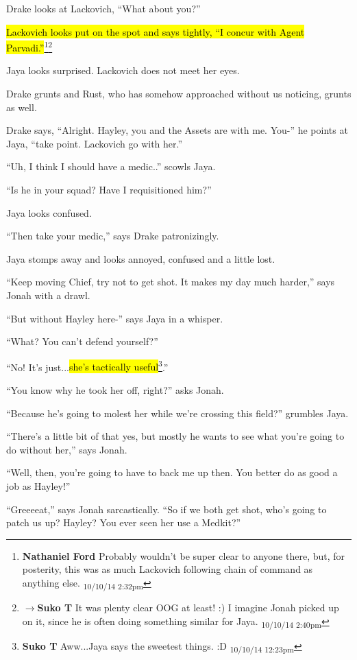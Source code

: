 Drake looks at Lackovich, ``What about you?''

\hl{Lackovich looks put on the spot and says tightly, ``I concur with Agent Parvadi.''}\footnote{\textbf{Nathaniel Ford }Probably wouldn't be super clear to anyone there, but, for posterity, this was as much Lackovich following chain of command as anything else. \textsubscript{10/10/14 2:32pm}}\footnote{$\rightarrow$\textbf{Suko T }It was plenty clear OOG at least! :) I imagine Jonah picked up on it, since he is often doing something similar for Jaya. \textsubscript{10/10/14 2:40pm}}

Jaya looks surprised.  Lackovich does not meet her eyes.

Drake grunts and Rust, who has somehow approached without us noticing, grunts as well. 

Drake says, ``Alright.  Hayley, you and the Assets are with me.  You-'' he points at Jaya, ``take point.  Lackovich go with her.''

``Uh, I think I should have a medic..'' scowls Jaya.

``Is he in your squad?  Have I requisitioned him?''

Jaya looks confused.

``Then take your medic,'' says Drake patronizingly.

Jaya stomps away and looks annoyed, confused and a little lost.

``Keep moving Chief, try not to get shot.  It makes my day much harder,'' says Jonah with a drawl.

``But without Hayley here-'' says Jaya in a whisper.

``What?  You can't defend yourself?''

``No!  It's just...\hl{she's tactically useful}\footnote{\textbf{Suko T }Aww...Jaya says the sweetest things. :D \textsubscript{10/10/14 12:23pm}}.''

``You know why he took her off, right?'' asks Jonah.

``Because he's going to molest her while we're crossing this field?'' grumbles Jaya.

``There's a little bit of that yes, but mostly he wants to see what you're going to do without her,'' says Jonah.

``Well, then, you're going to have to back me up then.  You better do as good a job as Hayley!''

``Greeeeat,'' says Jonah sarcastically.  ``So if we both get shot, who's going to patch us up?  Hayley?  You ever seen her use a Medkit?''

